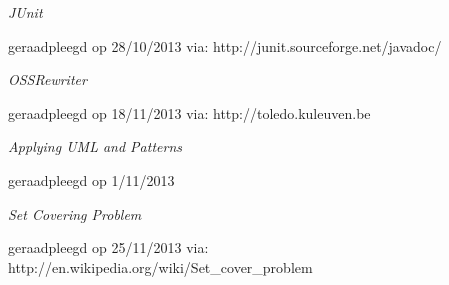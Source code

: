 \documentclass[i2]{oss}
\begin{document}
\begin{flushleft}
\begin{thebibliography}{9}

\textit{JUnit}
\begin{scriptsize}
geraadpleegd op 28/10/2013 via: \mbox{http://junit.sourceforge.net/javadoc/}
\end{scriptsize}

\textit{OSSRewriter}
\begin{scriptsize}
geraadpleegd op 18/11/2013 via: \mbox{http://toledo.kuleuven.be}
\end{scriptsize}

\textit{Applying UML and Patterns}
\begin{scriptsize}
geraadpleegd op 1/11/2013 
\end{scriptsize}

\textit{Set Covering Problem}
\begin{scriptsize}
geraadpleegd op 25/11/2013 via: \mbox{http://en.wikipedia.org/wiki/Set\_cover\_problem}
\end{scriptsize}


\end{thebibliography}
\end{flushleft}

 
\end{document}
